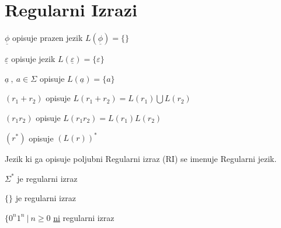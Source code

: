\documentclass[10pt,a4paper,oneside]{book}
\begin{document}
\section{Regularni Izrazi}
\begin{items}
	\item $ \underline{\phi} $ opisuje prazen jezik $ L(\underline{\phi})= \lbrace \rbrace $
	\item $ \underline{ \varepsilon } $ opisuje jezik $ L(\underline{ \varepsilon })= \lbrace \varepsilon\rbrace $
	\item $ \underline{a} \ , \ a \in \Sigma $ opisuje $ L ( \underline{a} ) = \lbrace a \rbrace $
	\item $ (r_1 + r_2) $ opisuje $ L(r_1 + r_2) = L(r_1) \bigcup L( r_2) $
	\item $ (r_1  r_2) $ opisuje $ L(r_1  r_2) = L(r_1) L( r_2) $
	\item $ (r^*) $ opisuje $ (L(r))^* $
\end{items}

Jezik ki ga opisuje poljubni Regularni izraz (RI) se imenuje Regularni jezik.
\begin{items}
	\item $\Sigma^* $ je regularni izraz
	\item $ \lbrace \rbrace $ je regularni izraz
	\item $ \lbrace 0^n 1^n \ | \ n \geqslant 0 $ \underline{ni} regularni izraz
\end{items}
	
\end{document}
